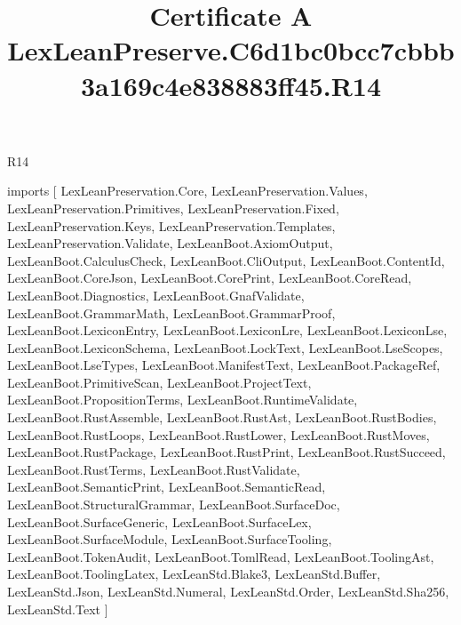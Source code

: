 \begin{lexlean}{R14}
\title{Certificate A LexLeanPreserve.C6d1bc0bcc7cbbb3a169c4e838883ff45.R14}
\begin{coremodule}
imports [
  LexLeanPreservation.Core,
  LexLeanPreservation.Values,
  LexLeanPreservation.Primitives,
  LexLeanPreservation.Fixed,
  LexLeanPreservation.Keys,
  LexLeanPreservation.Templates,
  LexLeanPreservation.Validate,
  LexLeanBoot.AxiomOutput,
  LexLeanBoot.CalculusCheck,
  LexLeanBoot.CliOutput,
  LexLeanBoot.ContentId,
  LexLeanBoot.CoreJson,
  LexLeanBoot.CorePrint,
  LexLeanBoot.CoreRead,
  LexLeanBoot.Diagnostics,
  LexLeanBoot.GnafValidate,
  LexLeanBoot.GrammarMath,
  LexLeanBoot.GrammarProof,
  LexLeanBoot.LexiconEntry,
  LexLeanBoot.LexiconLre,
  LexLeanBoot.LexiconLse,
  LexLeanBoot.LexiconSchema,
  LexLeanBoot.LockText,
  LexLeanBoot.LseScopes,
  LexLeanBoot.LseTypes,
  LexLeanBoot.ManifestText,
  LexLeanBoot.PackageRef,
  LexLeanBoot.PrimitiveScan,
  LexLeanBoot.ProjectText,
  LexLeanBoot.PropositionTerms,
  LexLeanBoot.RuntimeValidate,
  LexLeanBoot.RustAssemble,
  LexLeanBoot.RustAst,
  LexLeanBoot.RustBodies,
  LexLeanBoot.RustLoops,
  LexLeanBoot.RustLower,
  LexLeanBoot.RustMoves,
  LexLeanBoot.RustPackage,
  LexLeanBoot.RustPrint,
  LexLeanBoot.RustSucceed,
  LexLeanBoot.RustTerms,
  LexLeanBoot.RustValidate,
  LexLeanBoot.SemanticPrint,
  LexLeanBoot.SemanticRead,
  LexLeanBoot.StructuralGrammar,
  LexLeanBoot.SurfaceDoc,
  LexLeanBoot.SurfaceGeneric,
  LexLeanBoot.SurfaceLex,
  LexLeanBoot.SurfaceModule,
  LexLeanBoot.SurfaceTooling,
  LexLeanBoot.TokenAudit,
  LexLeanBoot.TomlRead,
  LexLeanBoot.ToolingAst,
  LexLeanBoot.ToolingLatex,
  LexLeanStd.Blake3,
  LexLeanStd.Buffer,
  LexLeanStd.Json,
  LexLeanStd.Numeral,
  LexLeanStd.Order,
  LexLeanStd.Sha256,
  LexLeanStd.Text
]


\end{coremodule}
\end{lexlean}
